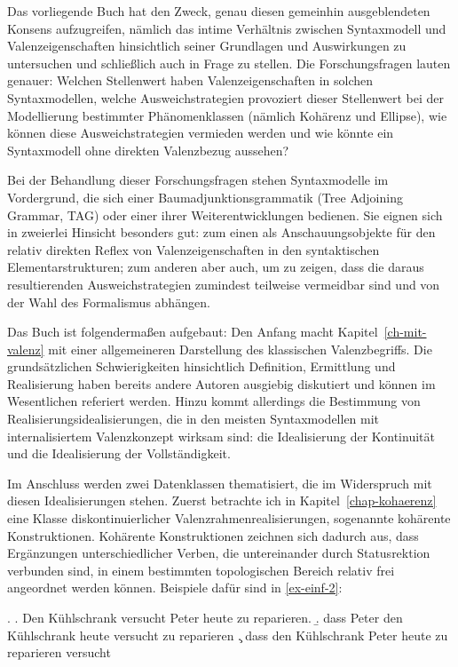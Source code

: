 Das vorliegende Buch hat den Zweck, genau diesen gemeinhin ausgeblendeten Konsens aufzugreifen, nämlich das intime Verhältnis zwischen Syntaxmodell und Valenzeigenschaften hinsichtlich seiner Grundlagen und Auswirkungen zu untersuchen und schlie\ss lich auch in Frage zu stellen. Die Forschungsfragen lauten genauer: Welchen Stellenwert haben Valenzeigenschaften in solchen Syntaxmodellen, welche Ausweichstrategien provoziert dieser Stellenwert bei der Modellierung bestimmter Phänomenklassen (nämlich Kohärenz und Ellipse), wie können diese Ausweichstrategien vermieden werden und wie könnte ein Syntaxmodell ohne direkten Valenzbezug aussehen?

Bei der Behandlung dieser Forschungsfragen stehen Syntaxmodelle im Vordergrund, die sich einer Baumadjunktionsgrammatik (Tree Adjoining Grammar, TAG) oder einer ihrer Weiterentwicklungen bedienen. Sie eignen sich in zweierlei Hinsicht besonders gut: zum einen als Anschauungsobjekte für den relativ direkten Reflex von Valenzeigenschaften in den syntaktischen Elementarstrukturen; zum anderen aber auch, um zu zeigen, dass die daraus resultierenden Ausweichstrategien zumindest teilweise vermeidbar sind und von der Wahl des Formalismus abhängen. %

Das Buch ist folgendermaßen aufgebaut: Den Anfang macht Kapitel~\ref{ch-mit-valenz} mit einer allgemeineren Darstellung des klassischen Valenzbegriffs. Die grundsätzlichen Schwierigkeiten hinsichtlich Definition, Ermittlung und Realisierung haben bereits andere Autoren ausgiebig diskutiert und können im Wesentlichen referiert werden. Hinzu kommt allerdings die Bestimmung von Realisierungsidealisierungen, die in den meisten Syntaxmodellen mit internalisiertem Valenzkonzept wirksam sind: die Idealisierung der Kontinuität und die Idealisierung der Vollständigkeit.

Im Anschluss werden zwei Datenklassen thematisiert, die im Widerspruch mit diesen Idealisierungen stehen. Zuerst betrachte ich in Kapitel~\ref{chap-kohaerenz} eine Klasse diskontinuierlicher Valenzrahmenrealisierungen, sogenannte kohärente Konstruktionen. Kohärente Konstruktionen zeichnen sich dadurch aus, dass Ergänzungen unterschiedlicher Verben, die untereinander durch Statusrektion verbunden sind, in einem bestimmten topologischen Bereich relativ frei angeordnet werden können. Beispiele dafür sind in \ref{ex-einf-2}:     
 
  \ex. \label{ex-einf-2}
  \a. \label{ex-einf-2-a}Den Kühlschrank versucht Peter heute zu reparieren.
  \b. \label{ex-einf-2-b}dass Peter den Kühlschrank heute versucht zu reparieren
  \c. \label{ex-einf-2-c}dass den Kühlschrank Peter heute zu reparieren versucht

